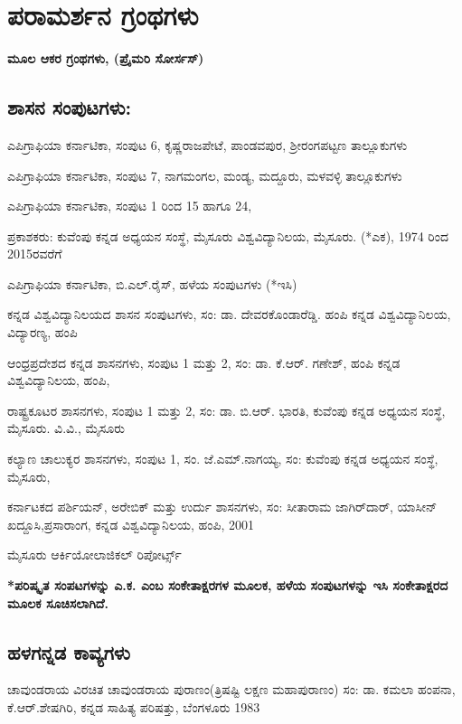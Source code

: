 
\chapter*{ಪರಾಮರ್ಶನ ಗ್ರಂಥಗಳು}

\begin{center}
\textbf{ಮೂಲ ಆಕರ ಗ್ರಂಥಗಳು, (ಪ್ರೈಮರಿ ಸೋರ್ಸಸ್​)}
\end{center}


\section{ಶಾಸನ ಸಂಪುಟಗಳು:}

\noindent
ಎಪಿಗ್ರಾಫಿಯಾ ಕರ್ನಾಟಿಕಾ, ಸಂಪುಟ 6, ಕೃಷ್ಣರಾಜಪೇಟೆ, ಪಾಂಡವಪುರ, ಶ‍್ರೀರಂಗಪಟ್ಟಣ ತಾಲ್ಲೂಕುಗಳು 

\noindent
ಎಪಿಗ್ರಾಫಿಯಾ ಕರ್ನಾಟಿಕಾ, ಸಂಪುಟ 7, ನಾಗಮಂಗಲ, ಮಂಡ್ಯ, ಮದ್ದೂರು, ಮಳವಳ್ಳಿ ತಾಲ್ಲೂಕುಗಳು

\noindent
ಎಪಿಗ್ರಾಫಿಯಾ ಕರ್ನಾಟಿಕಾ, ಸಂಪುಟ 1 ರಿಂದ 15 ಹಾಗೂ 24, 

\noindent
ಪ್ರಕಾಶಕರು: ಕುವೆಂಪು ಕನ್ನಡ ಅಧ್ಯಯನ ಸಂಸ್ಥೆ, ಮೈಸೂರು ವಿಶ್ವವಿದ್ಯಾನಿಲಯ, ಮೈಸೂರು. (*ಎಕ), 1974 ರಿಂದ 2015ರವರೆಗೆ

\noindent
ಎಪಿಗ್ರಾಫಿಯಾ ಕರ್ನಾಟಿಕಾ, ಬಿ.ಎಲ್​.ರೈಸ್​, ಹಳೆಯ ಸಂಪುಟಗಳು (*ಇಸಿ)

\noindent
ಕನ್ನಡ ವಿಶ್ವವಿದ್ಯಾನಿಲಯದ ಶಾಸನ ಸಂಪುಟಗಳು, ಸಂ: ಡಾ. ದೇವರಕೊಂಡಾರೆಡ್ಡಿ. ಹಂಪಿ ಕನ್ನಡ ವಿಶ್ವವಿದ್ಯಾನಿಲಯ, ವಿದ್ಯಾರಣ್ಯ, ಹಂಪಿ

\noindent
ಆಂಧ್ರಪ್ರದೇಶದ ಕನ್ನಡ ಶಾಸನಗಳು, ಸಂಪುಟ 1 ಮತ್ತು 2, ಸಂ: ಡಾ. ಕೆ.ಆರ್​. ಗಣೇಶ್​, ಹಂಪಿ ಕನ್ನಡ ವಿಶ್ವವಿದ್ಯಾನಿಲಯ, ಹಂಪಿ,

\noindent
ರಾಷ್ಟ್ರಕೂಟರ ಶಾಸನಗಳು, ಸಂಪುಟ 1 ಮತ್ತು 2, ಸಂ: ಡಾ. ಬಿ.ಆರ್​. ಭಾರತಿ, ಕುವೆಂಪು ಕನ್ನಡ ಅಧ್ಯಯನ ಸಂಸ್ಥೆ, ಮೈಸೂರು. ವಿ.ವಿ., ಮೈಸೂರು

\noindent
ಕಲ್ಯಾಣ ಚಾಲುಕ್ಯರ ಶಾಸನಗಳು, ಸಂಪುಟ 1, ಸಂ. ಜೆ.ಎಮ್.ನಾಗಯ್ಯ, ಸಂ: ಕುವೆಂಪು ಕನ್ನಡ ಅಧ್ಯಯನ ಸಂಸ್ಥೆ, ಮೈಸೂರು,

\noindent
ಕರ್ನಾಟಕದ ಪರ್ಶಿಯನ್​, ಅರೇಬಿಕ್​ ಮತ್ತು ಉರ್ದು ಶಾಸನಗಳು, ಸಂ: ಸೀತಾರಾಮ ಜಾಗಿರ್​ದಾರ್​, ಯಾಸೀನ್​ ಖದ್ದೂಸಿ,ಪ್ರಸಾರಾಂಗ, ಕನ್ನಡ ವಿಶ್ವವಿದ್ಯಾನಿಲಯ, ಹಂಪಿ, 2001

\noindent
ಮೈಸೂರು ಆರ್ಕಿಯೋಲಾಜಿಕಲ್​ ರಿಪೋರ್ಟ್ಸ್

\noindent
\textbf{*ಪರಿಷ್ಕೃತ ಸಂಪಟಗಳನ್ನು ಎ.ಕ. ಎಂಬ ಸಂಕೇತಾಕ್ಷರಗಳ ಮೂಲಕ, ಹಳೆಯ ಸಂಪುಟಗಳನ್ನು ಇಸಿ ಸಂಕೇತಾಕ್ಷರದ ಮೂಲಕ ಸೂಚಿಸಲಾಗಿದೆ.}


\section{ಹಳಗನ್ನಡ ಕಾವ್ಯಗಳು}

\noindent
ಚಾವುಂಡರಾಯ ವಿರಚಿತ ಚಾವುಂಡರಾಯ ಪುರಾಣಂ(ತ್ರಿಷಷ್ಟಿ ಲಕ್ಷಣ ಮಹಾಪುರಾಣಂ) ಸಂ: ಡಾ. ಕಮಲಾ ಹಂಪನಾ, ಕೆ.ಆರ್​.ಶೇಷಗಿರಿ, ಕನ್ನಡ ಸಾಹಿತ್ಯ ಪರಿಷತ್ತು, ಬೆಂಗಳೂರು 1983

